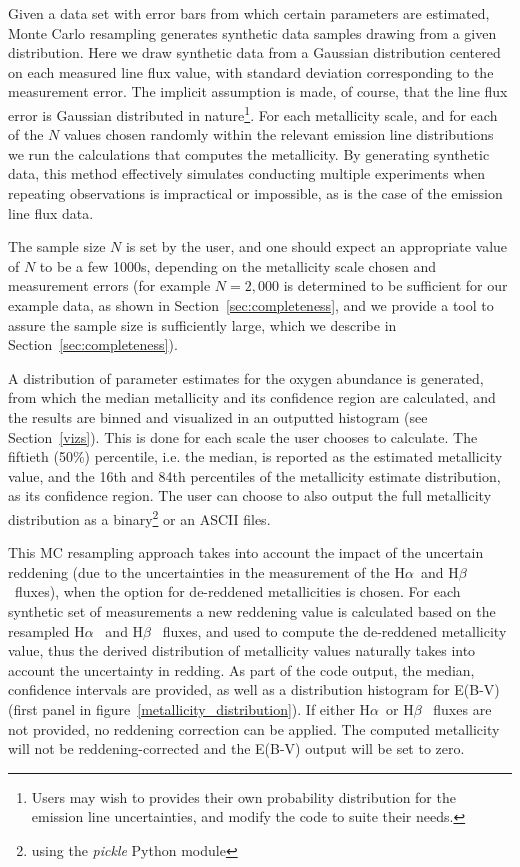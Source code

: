 \documentclass{emulateapj}
\newcommand{\ha}{H$\alpha$}
\newcommand{\hb}{H$\beta$}
\begin{document}
Given a data set with error bars from which certain parameters are estimated, Monte Carlo resampling generates synthetic data samples drawing from a given distribution. 
Here we draw synthetic data from a Gaussian distribution centered on each measured line flux value, with standard deviation corresponding to the measurement error. The implicit assumption is made, of course, that the line flux error is Gaussian distributed in nature\footnote{Users may wish to provides their own probability distribution for the emission line uncertainties, and modify the code to suite their needs.}. 
For each metallicity scale, and for each of the $N$ values chosen randomly within the relevant emission line distributions we run the calculations that computes the metallicity.
By generating synthetic data, this method effectively simulates conducting multiple experiments when repeating observations is impractical or impossible, as is the case of the emission line flux data.

The sample size $N$ is set by the user, and one should expect an appropriate value of $N$ to be a few 1000s, depending on the metallicity scale chosen and measurement errors (for example  $N=2,000$ is determined to be sufficient for our example data, as shown in Section~\ref{sec:completeness}, and we provide a tool to assure the sample size is sufficiently large, which we describe in Section~\ref{sec:completeness}). 

A distribution of parameter estimates for the oxygen abundance is generated, from which the median metallicity and its confidence region are calculated, and the results are binned and visualized in an outputted histogram (see Section~\ref{vizs}). This is done for each scale the user chooses to calculate. The fiftieth (50\%) percentile, i.e.  the median, is reported as the estimated metallicity value, and the 16th and 84th percentiles of the metallicity estimate distribution, as its confidence region. The user can choose to also output the full metallicity distribution as a binary\footnote{using the \emph{pickle} Python module} or an ASCII files.

This MC resampling approach takes into account the impact of the uncertain reddening (due to the uncertainties in the measurement of the 
\ha~and \hb~fluxes), when the option for de-reddened metallicities is chosen. For each synthetic set of measurements a new reddening value is calculated based on the resampled \ha~ and \hb~ fluxes, and used to compute the de-reddened metallicity value, thus the derived distribution of metallicity values naturally takes into account the uncertainty in redding. As part of the code output, the median, confidence intervals  are provided, as well as a distribution histogram for E(B-V) (first panel in figure~\ref{metallicity_distribution}). If either \ha~or \hb~ fluxes are not provided, no reddening correction can be applied. The computed metallicity will not be reddening-corrected and the E(B-V) output will be set to zero.
\end{document}

